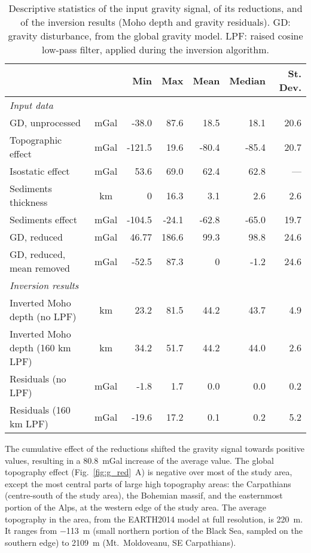 \begin{table}
    \caption[Descriptive statistics of the input gravity signal, of its reductions, and of the inversion results.]{Descriptive statistics of the input gravity signal, of its reductions, and of the inversion results (Moho depth and gravity residuals). GD: gravity disturbance, from the global gravity model. LPF: raised cosine low-pass filter, applied during the inversion algorithm.}
    \begin{adjustbox}{center}
    \begingroup\setlength{\fboxsep}{0pt}
    \colorbox{tablebackground}{%
	\begin{tabular}{lcrrrrr}
		\toprule
		 & & \textbf{Min} & \textbf{Max} & \textbf{Mean} & \textbf{Median} & \textbf{St. Dev.} \\
		 \midrule
		\textit{Input data} \\
		\quad GD, unprocessed & mGal & -38.0 & 87.6 & 18.5 & 18.1 & 20.6 \\
		\quad Topographic effect & mGal & -121.5 & 19.6 & -80.4 & -85.4 & 20.7 \\
		\quad Isostatic effect & mGal & 53.6 & 69.0 & 62.4 & 62.8 & --- \\
		\quad Sediments thickness & km & 0 & 16.3 & 3.1 & 2.6 & 2.6 \\
		\quad Sediments effect & mGal & -104.5 & -24.1 & -62.8 & -65.0 & 19.7 \\
		\quad GD, reduced & mGal & 46.77 & 186.6 & 99.3 & 98.8 & 24.6 \\
		\quad GD, reduced, mean removed & mGal & -52.5 & 87.3 & 0 & -1.2 & 24.6 \\
		\textit{Inversion results} \\
		\quad Inverted Moho depth (no LPF) & km & 23.2 & 81.5 & 44.2 & 43.7 & 4.9 \\
		\quad Inverted Moho depth (160 km LPF) & km & 34.2 & 51.7 & 44.2 & 44.0 & 2.6 \\
		\quad Residuals (no LPF) & mGal & -1.8 & 1.7 & 0.0 & 0.0 & 0.2 \\
		\quad Residuals (160 km LPF) & mGal & -19.6 & 17.2 & 0.1 & 0.2 & 5.2 \\
		\bottomrule
    \end{tabular}
    }\endgroup
    \end{adjustbox}
	\label{tab:GravDescrStats}
\end{table}

The cumulative effect of the reductions shifted the gravity signal towards positive values, resulting in a \SI{80.8}{mGal} increase of the average value.
The global topography effect (Fig.~\ref{fig:g_red}~A) is negative over most of the study area, except the most central parts of large high topography areas: the Carpathians (centre-south of the study area), the Bohemian massif, and the easternmost portion of the Alps, at the western edge of the study area.
The average topography in the area, from the {EARTH2014} model at full resolution, is \SI{220}{\metre}.
It ranges from \SI{-113}{\metre} (small northern portion of the Black Sea, sampled on the southern edge) to \SI{2109}{\metre} (Mt.~Moldoveanu, SE Carpathians).

